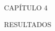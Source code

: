 \newpage
\thispagestyle{empty}
\vspace*{\fill}
\begingroup
\centering
\begin{flushright}{\fontsize{50}{60}\selectfont CAPÍTULO 4}\end{flushright}
\vspace{10 mm}
\begin{flushright}{\fontsize{30}{40}\selectfont RESULTADOS }\end{flushright}
\endgroup
\vspace*{\fill}
\newpage